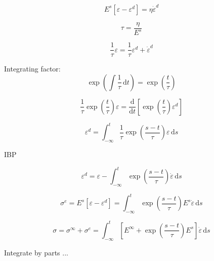 \documentclass[12pt]{article}
\renewcommand{\d}{\text{d}}
\newcommand{\der}[2]{\dfrac{\text{d} #1}{\text{d} #2}}
\begin{document}
\begin{equation}
	E^{s}\left[\varepsilon-\varepsilon^{d}\right] = \eta \dot{\varepsilon}^{d}
\end{equation}

\begin{equation}
	\tau = \dfrac{\eta}{E^{s}}
\end{equation}

\begin{equation}
	\dfrac{1}{\tau}\varepsilon =  \dfrac{1}{\tau}\varepsilon^{d} + \dot{\varepsilon}^{d}
\end{equation}

Integrating factor:
\begin{equation}
	\exp\left(\int\dfrac{1}{\tau}\,\d t\right) = 	\exp\left(\dfrac{t}{\tau}\right) 
\end{equation}

\begin{equation}
	\dfrac{1}{\tau}\exp\left(\dfrac{t}{\tau}\right) \varepsilon =  \der{ }{t}\left[\exp\left(\dfrac{t}{\tau}\right) \varepsilon^{d} \right] 
\end{equation}

\begin{equation}
	\varepsilon^{d} = \int_{-\infty}^{t}\dfrac{1}{\tau}\exp\left(\dfrac{s-t}{\tau}\right)\varepsilon \,\d s
\end{equation}

IBP

\begin{equation}
		\varepsilon^{d} = \varepsilon - \int_{-\infty}^{t} \exp\left(\dfrac{s-t}{\tau}\right)\dot{\varepsilon} \,\d s
\end{equation}

\begin{equation}
	\sigma^{e} = E^{s}\left[\varepsilon-\varepsilon^{d}\right] =  \int_{-\infty}^{t} \exp\left(\dfrac{s-t}{\tau}\right)E^{s}\dot{\varepsilon} \,\d s
\end{equation}

\begin{equation}
	\sigma = \sigma^{\infty} + \sigma^{e} = \int_{-\infty}^{t} \left[E^{\infty} + \exp\left(\dfrac{s-t}{\tau}\right)E^{s}\right]\dot{\varepsilon} \,\d s
\end{equation}

Integrate by parts ...
\end{document}
